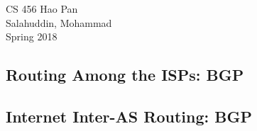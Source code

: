 \documentclass{article}
\begin{document}
\noindent
{CS 456 \hfill Hao Pan}\\
{Salahuddin, Mohammad}\\
{Spring 2018}


\begin{center}
\section{Routing Among the ISPs: BGP}
\noindent
\end{center}

\subsection{Internet Inter-AS Routing: BGP}
\end{document}
